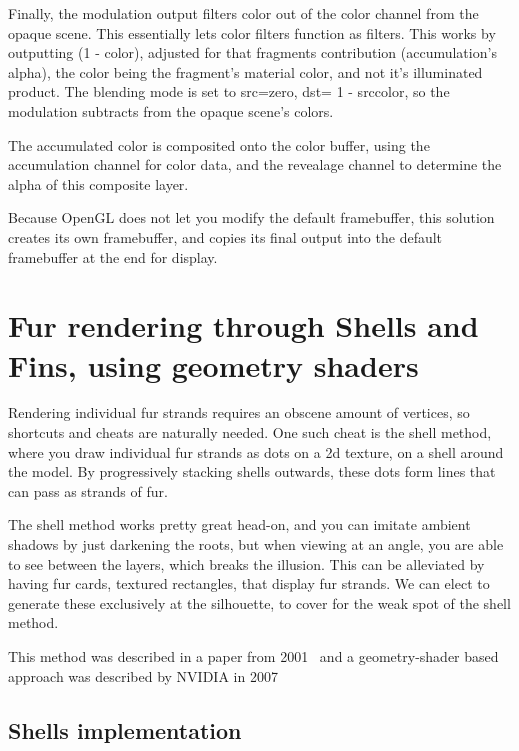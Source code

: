 \documentclass[a4paper, 12pt]{article}
\begin{document}
    Finally, the modulation output filters color out of the color channel from the opaque scene.
    This essentially lets color filters function as filters.
    This works by outputting (1 - color), adjusted for that fragments contribution (accumulation's alpha),
    the color being the fragment's material color, and not it's illuminated product.
    The blending mode is set to src=zero, dst= 1 - srccolor,
    so the modulation subtracts from the opaque scene's colors.

    The accumulated color is composited onto the color buffer,
    using the accumulation channel for color data,
    and the revealage channel to determine the alpha of this composite layer.

    Because OpenGL does not let you modify the default framebuffer,
    this solution creates its own framebuffer,
    and copies its final output into the default framebuffer at the end for display.

    \section{Fur rendering through Shells and Fins, using geometry shaders}

    Rendering individual fur strands requires an obscene amount of vertices,
    so shortcuts and cheats are naturally needed.
    One such cheat is the shell method,
    where you draw individual fur strands as dots on a 2d texture,
    on a shell around the model.
    By progressively stacking shells outwards,
    these dots form lines that can pass as strands of fur.

    The shell method works pretty great head-on,
    and you can imitate ambient shadows by just darkening the roots,
    but when viewing at an angle, you are able to see between the layers,
    which breaks the illusion.
    This can be alleviated by having fur cards, textured rectangles,
    that display fur strands.
    We can elect to generate these exclusively at the silhouette,
    to cover for the weak spot of the shell method.

    This method was described in a paper from 2001~\cite{Lengyel:2001:RFO}
    and a geometry-shader based approach was described by NVIDIA in 2007
    ~\cite{nvidiafur,nvidiasamples}

    \subsection{Shells implementation}
\end{document}
